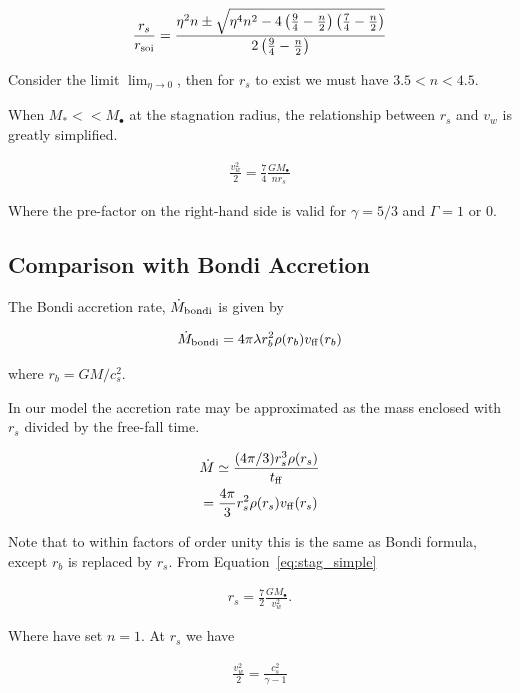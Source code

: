 \documentclass[usenatbib,fleqn]{mn2e}
\newcommand{\Mdotb}{\dot{M}_{\rm bondi}}
\newcommand{\rs}{r_s}
\newcommand{\rb}{r_b}
\newcommand{\vw}{v_w}
\newcommand{\kew}{\frac{v_w^2}{2}}
\newcommand{\Mstar}{M_{*}}
\newcommand{\Mbh}[1][]{M_{\bullet#1}}
\newcommand{\soi}{\rm soi}
\newcommand{\ff}{\rm ff}
\newcommand{\rsoi}{r_{\soi}}
\newcommand{\x}{\frac{r_s}{\rsoi}}
\begin{document}
\begin{align}
\x=\frac{\eta^2 n \pm \sqrt{\eta^4 n^2 -4 \left(\frac{9}{4}-\frac{n}{2}\right) \left(\frac{7}{4}-\frac{n}{2}\right)}}{2\left(\frac{9}{4}-\frac{n}{2}\right)}
\end{align}

Consider the limit $\lim_{\eta \to 0}$, then for $\rs$ to exist we must have $3.5<n<4.5$.

When $\Mstar << \Mbh$ at the stagnation radius, the relationship between $\rs$ and $\vw$ is greatly simplified. 

\begin{align}
\kew=\frac{7}{4}\frac{G \Mbh}{n \rs}
\label{eq:stag_simple}
\end{align}

Where the pre-factor on the right-hand side is valid for $\gamma=5/3$ and $\Gamma=1$ or 0.  


\subsection{Comparison with Bondi Accretion}
The Bondi accretion rate, $\Mdotb$ is given by 

\begin{align}
\Mdotb=4\pi \lambda r_b^2 \rho(r_b) v_{\rm ff}(r_b)
\end{align}

where $r_b=G M/c_s^2$.

In our model the accretion rate may be approximated as the mass enclosed with $\rs$ divided by the free-fall time.

\begin{align}
&\dot{M}\simeq\frac{(4 \pi/3) \rs^3 \rho(\rs)}{t_{\ff}}\\
&=\frac{4 \pi}{3} \rs^2 \rho(\rs) v_{\ff}(\rs)
\end{align}

Note that to within factors of order unity this is the same as Bondi formula, except $\rb$ is replaced by $\rs$. 
From Equation~\ref{eq:stag_simple}

\begin{align}
\rs=\frac{7}{2}\frac{G \Mbh}{\vw^2}.
\end{align}

Where have set $n=1$.  At $\rs$ we have

\begin{align}
\kew=\frac{c_s^2}{\gamma-1}
\end{align}
\end{document}
